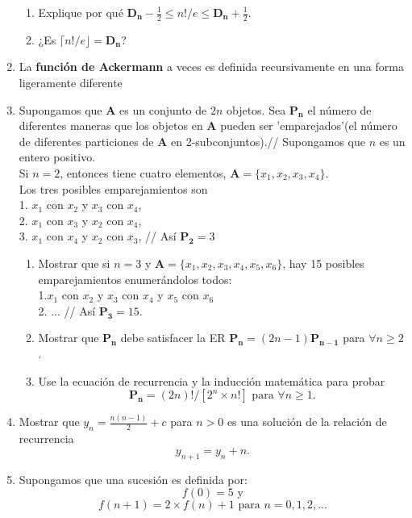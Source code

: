 \documentclass[12pt, a4paper]{book}
\begin{document}
\begin{enumerate}
\begin{enumerate}
        \item Explique por qué $\mathbf{D_n}-\frac{1}{2}\leq n!/e\leq \mathbf{D_n}+\frac{1}{2}$.
        \item ¿Es $\lceil n!/e\rfloor =\mathbf{D_n}$?
    \end{enumerate}
    \item La \textbf{función de Ackermann} a veces es definida recursivamente en una forma ligeramente diferente
    \item Supongamos que \textbf{A} es un conjunto de $2n$ objetos. Sea $\mathbf{P_n}$ el número de diferentes maneras que los objetos en \textbf{A} pueden ser 'emparejados'(el número de diferentes particiones de \textbf{A} en 2-subconjuntos).\hfill // Supongamos que $n$ es un entero positivo.\\[0.2cm]
    Si $n=2$, entonces  tiene cuatro elementos, $\mathbf{A}=\{x_1,x_2,x_3,x_4\}$.\\[0.1cm]
    Los tres posibles emparejamientos son\\
    1. $x_1$ con $x_2$ y $x_3$ con $x_4$,\\
    2. $x_1$ con $x_3$ y $x_2$ con $x_4$,\\
    3. $x_1$ con $x_4$ y $x_2$ con $x_3$,\hspace{3cm} // Así $\mathbf{P_2}=3$
    \begin{enumerate}
        \item Mostrar que si $n=3$ y $\mathbf{A}=\{x_1,x_2,x_3,x_4,x_5,x_6\}$, hay 15 posibles emparejamientos enumerándolos todos:\\
        1.$x_1$ con $x_2$ y $x_3$ con $x_4$ y $x_5$ con $x_6$\\
        2. ... \hspace{5.3cm} // Así $\mathbf{P_3}=15$.
        \item Mostrar que $\mathbf{P_n}$ debe satisfacer la ER $\mathbf{P_n}=(2n-1)\mathbf{P_{n-1}}$ para $\forall n\geq2$.
        \item Use la ecuación de recurrencia y la inducción matemática para probar $$\mathbf{P_n}=(2n)!/[2^n\times n!]\text{ para }\forall n\geq 1.$$
    \end{enumerate}
    \item Mostrar que $y_n=\frac{n(n-1)}{2}+c$ para $n>0$ es una solución de la relación de recurrencia $$y_{n+1}=y_n+n.$$
    \item Supongamos que una sucesión es definida por:$$f(0)=5\text{ y}$$ $$f(n+1)=2\times f(n)+1\text{ para } n=0,1,2,...$$
    \begin{enumerate}

\end{enumerate}
\end{enumerate}
\end{document}

